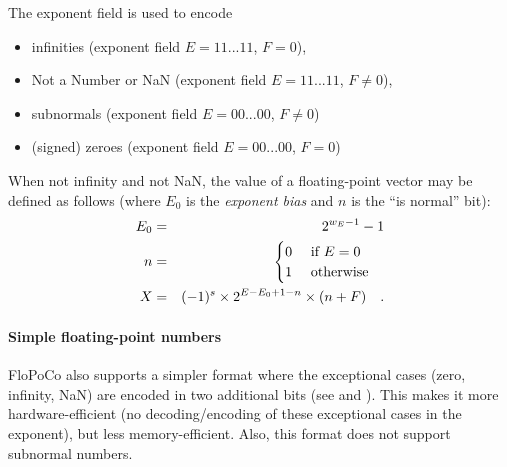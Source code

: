\documentclass{article}
\begin{document}
 The exponent field is used to encode
 \begin{itemize}
 \item infinities (exponent field $E=11...11$, $F=0$),
 \item Not a Number or NaN (exponent field $E=11...11$, $F\ne 0$),
 \item subnormals (exponent field $E=00...00$, $F\ne 0$)
 \item (signed) zeroes (exponent field $E=00...00$, $F=0$)
 \end{itemize}

When not infinity and not NaN, the value of a floating-point vector may be defined as follows (where $E_0$ is  the \emph{exponent bias} and $n$ is the ``is normal'' bit):
\begin{eqnarray}
  E_0 &=& 2^{{w_E}-1}-1\\
 n &=&
\begin{cases}
0 \quad\text{ if } E=0 \\
1 \quad\text{ otherwise}
\end{cases}\nonumber\\
X &=& (-1)^{s}  \times 2^{E-E_0+1-n} \times (n+F) \quad .\label{eq:repr:normalbit}\nonumber
\end{eqnarray}

 
\paragraph{Simple floating-point numbers}

FloPoCo also supports a simpler format where  the exceptional cases (zero, infinity, NaN) are encoded in two additional bits (see  and ).
This makes it more hardware-efficient (no decoding/encoding of these exceptional cases in the exponent), but less memory-efficient.
Also, this format does not support subnormal numbers.
\end{document}
